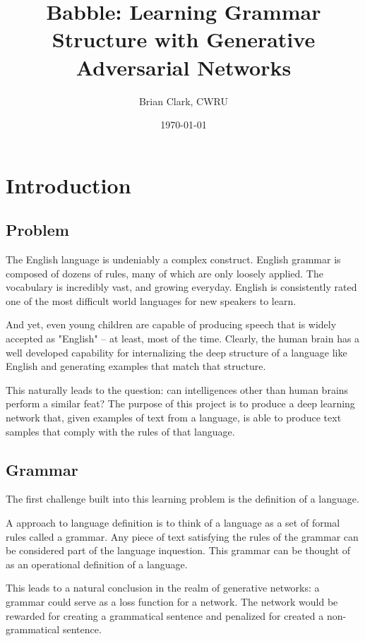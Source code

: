 \documentclass[12pt]{article}
\title{Babble: Learning Grammar Structure with Generative Adversarial Networks}
\author{Brian Clark, CWRU}
\date{\today}
\begin{document}
\maketitle
\tableofcontents


\section{Introduction}

\subsection{Problem}

The English language is undeniably a complex construct. English grammar is composed of dozens of rules, many of which are only loosely applied. The vocabulary is incredibly vast, and growing everyday. English is consistently rated one of the most difficult world languages for new speakers to learn.

And yet, even young children are capable of producing speech that is widely accepted as "English" -- at least, most of the time. Clearly, the human brain has a well developed capability for internalizing the deep structure of a language like English and generating examples that match that structure.

This naturally leads to the question: can intelligences other than human brains perform a similar feat? The purpose of this project is to produce a deep learning network that, given examples of text from a language, is able to produce text samples that comply with the rules of that language.

\subsection{Grammar}

The first challenge built into this learning problem is the definition of a language.

A approach to language definition is to think of a language as a set of formal rules called a grammar\cite{nltk_book}. Any piece of text satisfying the rules of the grammar can be considered part of the language inquestion. This grammar can be thought of as an operational definition of a language.

This leads to a natural conclusion in the realm of generative networks: a grammar could serve as a loss function for a network. The network would be rewarded for creating a grammatical sentence and penalized for created a non-grammatical sentence.
\end{document}
